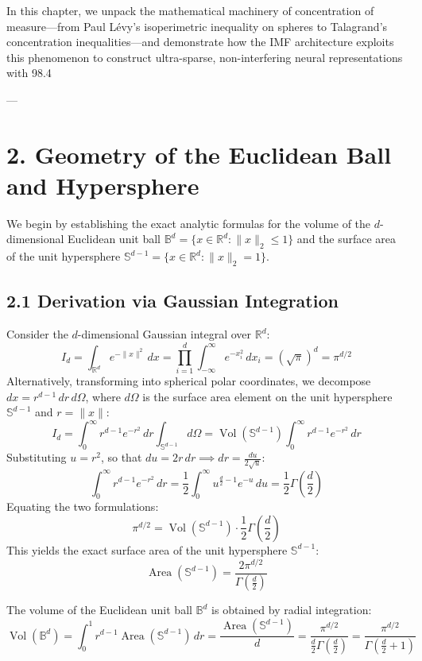 \documentclass[11pt,twoside,openright]{amsbook}
\begin{document}
In this chapter, we unpack the mathematical machinery of concentration of measure—from Paul Lévy's isoperimetric inequality on spheres to Talagrand's concentration inequalities—and demonstrate how the IMF architecture exploits this phenomenon to construct ultra-sparse, non-interfering neural representations with 98.4%

---

\section{2. Geometry of the Euclidean Ball and Hypersphere}

We begin by establishing the exact analytic formulas for the volume of the $d$-dimensional Euclidean unit ball $\mathbb{B}^d = \{x \in \mathbb{R}^d : \|x\|_2 \le 1\}$ and the surface area of the unit hypersphere $\mathbb{S}^{d-1} = \{x \in \mathbb{R}^d : \|x\|_2 = 1\}$.

\subsection{2.1 Derivation via Gaussian Integration}

Consider the $d$-dimensional Gaussian integral over $\mathbb{R}^d$:
$$I_d = \int_{\mathbb{R}^d} e^{-\|x\|^2} \, dx = \prod_{i=1}^d \int_{-\infty}^\infty e^{-x_i^2} \, dx_i = (\sqrt{\pi})^d = \pi^{d/2}$$
Alternatively, transforming into spherical polar coordinates, we decompose $dx = r^{d-1} \, dr \, d\Omega$, where $d\Omega$ is the surface area element on the unit hypersphere $\mathbb{S}^{d-1}$ and $r = \|x\|$:
$$I_d = \int_0^\infty r^{d-1} e^{-r^2} \, dr \int_{\mathbb{S}^{d-1}} d\Omega = \operatorname{Vol}(\mathbb{S}^{d-1}) \int_0^\infty r^{d-1} e^{-r^2} \, dr$$
Substituting $u = r^2$, so that $du = 2r \, dr \implies dr = \frac{du}{2\sqrt{u}}$:
$$\int_0^\infty r^{d-1} e^{-r^2} \, dr = \frac{1}{2} \int_0^\infty u^{\frac{d}{2} - 1} e^{-u} \, du = \frac{1}{2} \Gamma\left(\frac{d}{2}\right)$$
Equating the two formulations:
$$\pi^{d/2} = \operatorname{Vol}(\mathbb{S}^{d-1}) \cdot \frac{1}{2} \Gamma\left(\frac{d}{2}\right)$$
This yields the exact surface area of the unit hypersphere $\mathbb{S}^{d-1}$:
$$\operatorname{Area}(\mathbb{S}^{d-1}) = \frac{2 \pi^{d/2}}{\Gamma\left(\frac{d}{2}\right)}$$

The volume of the Euclidean unit ball $\mathbb{B}^d$ is obtained by radial integration:
$$\operatorname{Vol}(\mathbb{B}^d) = \int_0^1 r^{d-1} \operatorname{Area}(\mathbb{S}^{d-1}) \, dr = \frac{\operatorname{Area}(\mathbb{S}^{d-1})}{d} = \frac{\pi^{d/2}}{\frac{d}{2} \Gamma\left(\frac{d}{2}\right)} = \frac{\pi^{d/2}}{\Gamma\left(\frac{d}{2} + 1\right)}$$
\end{document}
